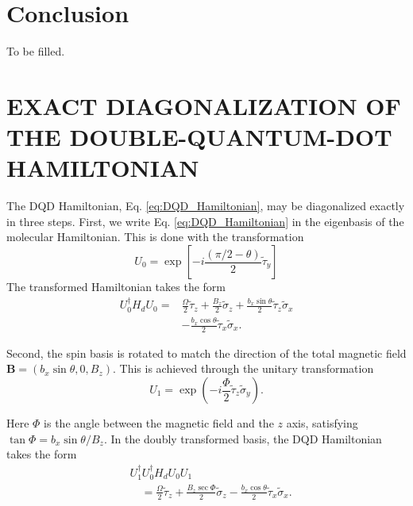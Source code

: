 \documentclass[12pt]{article}
\begin{document}
\section{Conclusion}
To be filled.

\appendix
\section{EXACT DIAGONALIZATION OF THE DOUBLE-QUANTUM-DOT HAMILTONIAN}
The DQD Hamiltonian, Eq. \ref{eq:DQD_Hamiltonian}, may be diagonalized exactly in three steps. 
First, we write Eq. \ref{eq:DQD_Hamiltonian} in the eigenbasis of the molecular Hamiltonian. This is done with the transformation
$$
U_0=\exp \left[-i \frac{(\pi / 2-\theta)}{2} \widetilde{\tau}_y\right]
$$
The transformed Hamiltonian takes the form
$$
\begin{aligned}
U_0^{\dagger} H_d U_0= & \frac{\Omega}{2} \widetilde{\tau}_z+\frac{B_z}{2} \widetilde{\sigma}_z+\frac{b_x \sin \theta}{2} \widetilde{\tau}_z \widetilde{\sigma}_x \\
& -\frac{b_x \cos \theta}{2} \widetilde{\tau}_x \widetilde{\sigma}_x .
\end{aligned}
$$

Second, the spin basis is rotated to match the direction of the total magnetic field $\mathbf{B}=\left(b_x \sin \theta, 0, B_z\right)$. This is achieved through the unitary transformation
\begin{equation}
    U_1=\exp \left(-i \frac{\Phi}{2} \widetilde{\tau}_z \widetilde{\sigma}_y\right) .    
\end{equation}


Here $\Phi$ is the angle between the magnetic field and the $z$ axis, satisfying $\tan \Phi=b_x \sin \theta / B_z$. In the doubly transformed basis, the DQD Hamiltonian takes the form
\begin{equation}\label{eq:A4}
    \begin{aligned}
        & U_1^{\dagger} U_0^{\dagger} H_d U_0 U_1 \\
        & \quad=\frac{\Omega}{2} \widetilde{\tau}_z+\frac{B_z \sec \Phi}{2} \widetilde{\sigma}_z-\frac{b_x \cos \theta}{2} \widetilde{\tau}_x \widetilde{\sigma}_x .
    \end{aligned}
\end{equation}
\end{document}
